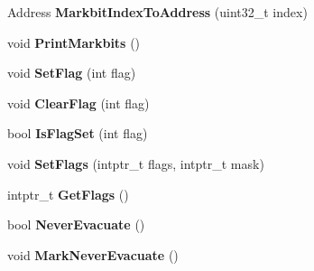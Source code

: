 \begin{DoxyCompactItemize}
\item 
Address {\bfseries Markbit\+Index\+To\+Address} (uint32\+\_\+t index)\hypertarget{classv8_1_1internal_1_1_memory_chunk_a5ee84229c5c4c3f06227682a94930cf1}{}\label{classv8_1_1internal_1_1_memory_chunk_a5ee84229c5c4c3f06227682a94930cf1}

\item 
void {\bfseries Print\+Markbits} ()\hypertarget{classv8_1_1internal_1_1_memory_chunk_a425f2a823238ce64db431053707772f6}{}\label{classv8_1_1internal_1_1_memory_chunk_a425f2a823238ce64db431053707772f6}

\item 
void {\bfseries Set\+Flag} (int flag)\hypertarget{classv8_1_1internal_1_1_memory_chunk_a79b86e423956219c0a048b3dbcff6abb}{}\label{classv8_1_1internal_1_1_memory_chunk_a79b86e423956219c0a048b3dbcff6abb}

\item 
void {\bfseries Clear\+Flag} (int flag)\hypertarget{classv8_1_1internal_1_1_memory_chunk_adb4258f348c4ca8d6fd5e0dc962046b3}{}\label{classv8_1_1internal_1_1_memory_chunk_adb4258f348c4ca8d6fd5e0dc962046b3}

\item 
bool {\bfseries Is\+Flag\+Set} (int flag)\hypertarget{classv8_1_1internal_1_1_memory_chunk_a01e5775f7047a3ff75f0c24afabb6e96}{}\label{classv8_1_1internal_1_1_memory_chunk_a01e5775f7047a3ff75f0c24afabb6e96}

\item 
void {\bfseries Set\+Flags} (intptr\+\_\+t flags, intptr\+\_\+t mask)\hypertarget{classv8_1_1internal_1_1_memory_chunk_a21cd4531eb88e68db9a9805460824816}{}\label{classv8_1_1internal_1_1_memory_chunk_a21cd4531eb88e68db9a9805460824816}

\item 
intptr\+\_\+t {\bfseries Get\+Flags} ()\hypertarget{classv8_1_1internal_1_1_memory_chunk_ac57eac8426605f97ed215ddf886d75b4}{}\label{classv8_1_1internal_1_1_memory_chunk_ac57eac8426605f97ed215ddf886d75b4}

\item 
bool {\bfseries Never\+Evacuate} ()\hypertarget{classv8_1_1internal_1_1_memory_chunk_adb32669679a246e5bd54404de55a3429}{}\label{classv8_1_1internal_1_1_memory_chunk_adb32669679a246e5bd54404de55a3429}

\item 
void {\bfseries Mark\+Never\+Evacuate} ()\hypertarget{classv8_1_1internal_1_1_memory_chunk_a67bb1a9d9c61a11bc804df209743ebc0}{}\label{classv8_1_1internal_1_1_memory_chunk_a67bb1a9d9c61a11bc804df209743ebc0}


\end{DoxyCompactItemize}

